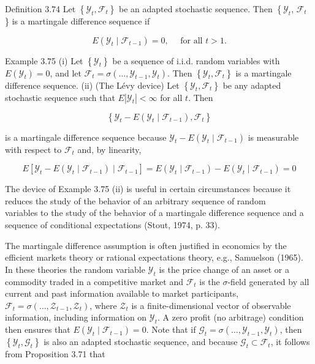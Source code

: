 \documentclass[10pt]{article}
\begin{document}
Definition 3.74 Let $\left\{\mathcal{Y}_{t}, \mathcal{F}_{t}\right\}$ be an adapted stochastic sequence. Then $\left\{\mathcal{Y}_{t}\right.$, $\mathcal{F}_{t}$ \} is a martingale difference sequence if

$$
E\left(\mathcal{Y}_{t} \mid \mathcal{F}_{t-1}\right)=0, \quad \text { for all } t>1 .
$$

Example 3.75 (i) Let $\left\{\mathcal{Y}_{t}\right\}$ be a sequence of i.i.d. random variables with $E\left(\mathcal{Y}_{t}\right)=0$, and let $\mathcal{F}_{t}=\sigma\left(\ldots, \mathcal{Y}_{t-1}, \mathcal{Y}_{t}\right)$. Then $\left\{\mathcal{Y}_{t}, \mathcal{F}_{t}\right\}$ is a martingale difference sequence. (ii) (The Lévy device) Let $\left\{\mathcal{Y}_{t}, \mathcal{F}_{t}\right\}$ be any adapted stochastic sequence such that $E\left|\mathcal{Y}_{t}\right|<\infty$ for all $t$. Then

$$
\left\{\mathcal{Y}_{t}-E\left(\mathcal{Y}_{t} \mid \mathcal{F}_{t-1}\right), \mathcal{F}_{t}\right\}
$$

is a martingale difference sequence because $\mathcal{Y}_{t}-E\left(\mathcal{Y}_{t} \mid \mathcal{F}_{t-1}\right)$ is measurable with respect to $\mathcal{F}_{t}$ and, by linearity,

$$
E\left[\mathcal{Y}_{t}-E\left(\mathcal{Y}_{t} \mid \mathcal{F}_{t-1}\right) \mid \mathcal{F}_{t-1}\right]=E\left(\mathcal{Y}_{t} \mid \mathcal{F}_{t-1}\right)-E\left(\mathcal{Y}_{t} \mid \mathcal{F}_{t-1}\right)=0
$$

The device of Example 3.75 (ii) is useful in certain circumstances because it reduces the study of the behavior of an arbitrary sequence of random\\
variables to the study of the behavior of a martingale difference sequence and a sequence of conditional expectations (Stout, 1974, p. 33).

The martingale difference assumption is often justified in economics by the efficient markets theory or rational expectations theory, e.g., Samuelson (1965). In these theories the random variable $\mathcal{Y}_{t}$ is the price change of an asset or a commodity traded in a competitive market and $\mathcal{F}_{t}$ is the $\sigma$-field generated by all current and past information available to market participants, $\mathcal{F}_{t}=\sigma\left(\ldots, \mathcal{Z}_{t-1}, \mathcal{Z}_{t}\right)$, where $\mathcal{Z}_{t}$ is a finite-dimensional vector of observable information, including information on $\mathcal{Y}_{t}$. A zero profit (no arbitrage) condition then ensures that $E\left(\mathcal{Y}_{t} \mid \mathcal{F}_{t-1}\right)=0$. Note that if $\mathcal{G}_{t}= \sigma\left(\ldots, \mathcal{Y}_{t-1}, \mathcal{Y}_{t}\right)$, then $\left\{\mathcal{Y}_{t}, \mathcal{G}_{t}\right\}$ is also an adapted stochastic sequence, and because $\mathcal{G}_{t} \subset \mathcal{F}_{t}$, it follows from Proposition 3.71 that
\end{document}
